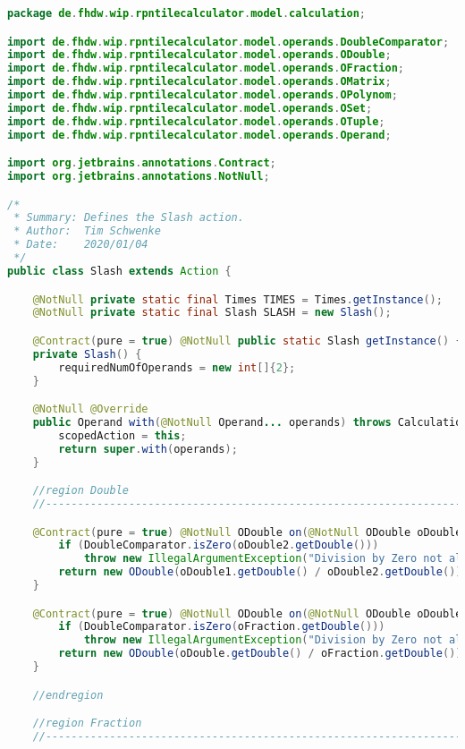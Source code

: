 \begin{lstlisting}[caption=Slash (Schwenke),label=list:Slash,language=Java]
package de.fhdw.wip.rpntilecalculator.model.calculation;

import de.fhdw.wip.rpntilecalculator.model.operands.DoubleComparator;
import de.fhdw.wip.rpntilecalculator.model.operands.ODouble;
import de.fhdw.wip.rpntilecalculator.model.operands.OFraction;
import de.fhdw.wip.rpntilecalculator.model.operands.OMatrix;
import de.fhdw.wip.rpntilecalculator.model.operands.OPolynom;
import de.fhdw.wip.rpntilecalculator.model.operands.OSet;
import de.fhdw.wip.rpntilecalculator.model.operands.OTuple;
import de.fhdw.wip.rpntilecalculator.model.operands.Operand;

import org.jetbrains.annotations.Contract;
import org.jetbrains.annotations.NotNull;

/*
 * Summary: Defines the Slash action.
 * Author:  Tim Schwenke
 * Date:    2020/01/04
 */
public class Slash extends Action {

    @NotNull private static final Times TIMES = Times.getInstance();
    @NotNull private static final Slash SLASH = new Slash();

    @Contract(pure = true) @NotNull public static Slash getInstance() { return SLASH; }
    private Slash() {
        requiredNumOfOperands = new int[]{2};
    }

    @NotNull @Override
    public Operand with(@NotNull Operand... operands) throws CalculationException {
        scopedAction = this;
        return super.with(operands);
    }

    //region Double
    //------------------------------------------------------------------------------------

    @Contract(pure = true) @NotNull ODouble on(@NotNull ODouble oDouble1, @NotNull ODouble oDouble2) {
        if (DoubleComparator.isZero(oDouble2.getDouble()))
            throw new IllegalArgumentException("Division by Zero not allowed");
        return new ODouble(oDouble1.getDouble() / oDouble2.getDouble());
    }

    @Contract(pure = true) @NotNull ODouble on(@NotNull ODouble oDouble, @NotNull OFraction oFraction) {
        if (DoubleComparator.isZero(oFraction.getDouble()))
            throw new IllegalArgumentException("Division by Zero not allowed");
        return new ODouble(oDouble.getDouble() / oFraction.getDouble());
    }

    //endregion

    //region Fraction
    //------------------------------------------------------------------------------------


\end{lstlisting}
